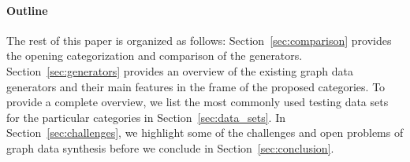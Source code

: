 

\paragraph*{Outline} The rest of this paper is organized as follows: Section~\ref{sec:comparison}  provides the opening categorization and comparison of the generators. Section~\ref{sec:generators} provides an overview of the existing graph data generators and their main features in the frame of the proposed categories. To provide a complete overview,  we list the most commonly used testing data sets for the particular categories in Section~\ref{sec:data_sets}.  In Section~\ref{sec:challenges}, we highlight some of the challenges and open problems of graph data synthesis before we conclude in Section~\ref{sec:conclusion}.


